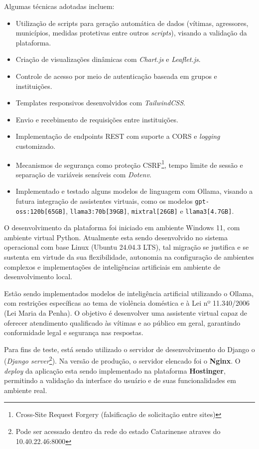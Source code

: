 Algumas técnicas adotadas incluem:
\begin{itemize}
\item Utilização de scripts para geração automática de dados (vítimas, agressores, municípios, medidas protetivas entre outros \textit{scripts}), visando a validação da plataforma.
\item Criação de visualizações dinâmicas com \textit{Chart.js} e \textit{Leaflet.js}.
\item Controle de acesso por meio de autenticação baseada em grupos e instituições.
\item Templates responsivos desenvolvidos com \textit{TailwindCSS}.
\item Envio e recebimento de requisições entre instituições.
\item Implementação de endpoints REST com suporte a CORS e \textit{logging} customizado.
\item Mecanismos de segurança como proteção CSRF\footnote{Cross-Site Request Forgery (falsificação de solicitação entre sites)}, tempo limite de sessão e separação de variáveis sensíveis com \textit{Dotenv}.
\item Implementado e testado alguns modelos de linguagem com Ollama, visando a futura integração de assistentes virtuais, como os modelos \texttt{gpt-oss:120b[65GB]}, \texttt{llama3:70b[39GB]}, \texttt{mixtral[26GB]} e \texttt{llama3[4.7GB]}.
\end{itemize}

\par O desenvolvimento da plataforma foi iniciado em ambiente Windows 11, com ambiente virtual Python. Atualmente esta sendo desenvolvido no sistema operacional com base Linux (Ubuntu 24.04.3 LTS), tal migração se justifica e se sustenta em virtude da sua flexibilidade, autonomia na configuração de ambientes complexos e implementações de inteligências artificiais em ambiente de desenvolvimento local.

\par Estão sendo implementados modelos de inteligência artificial utilizando o Ollama, com restrições específicas ao tema de violência doméstica e à Lei nº 11.340/2006 (Lei Maria da Penha). O objetivo é desenvolver uma assistente virtual capaz de oferecer atendimento qualificado às vítimas e ao público em geral, garantindo conformidade legal e segurança nas respostas.

\par Para fins de teste, está sendo utilizado o servidor de desenvolvimento do Django o (\textit{Django server}\footnote{Pode ser acessado dentro da rede do estado Catarinense atraves do 10.40.22.46:8000}). Na versão de produção, o servidor elencado foi o \textbf{Nginx}. O \textit{deploy} da aplicação esta sendo implementado na plataforma \textbf{Hostinger}, permitindo a validação da interface do usuário e de suas funcionalidades em ambiente real.

